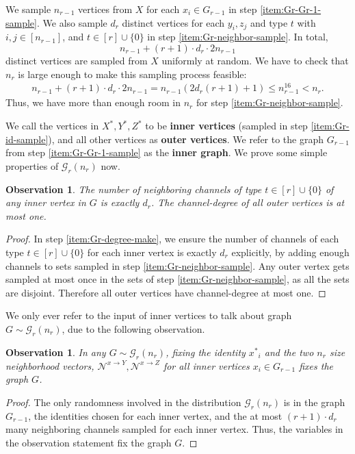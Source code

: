 \documentclass[11pt]{article}
\newtheorem{observation}[lemma]{Observation}
\theoremstyle{definition}
\renewcommand{\leq}{\leqslant}
\newcommand{\xstar}{\ensuremath{x^{*}}}
\newcommand{\Xstar}{\ensuremath{X^{*}}}
\newcommand{\Ystar}{\ensuremath{Y^{*}}}
\newcommand{\Zstar}{\ensuremath{Z^{*}}}
\newcommand{\Nbhood}[3]{\ensuremath{\mathcal{N}^{#1_{#3} \to #2}}}
\newcommand{\cG}{\ensuremath{\mathcal{G}}}
\begin{document}
We sample $n_{r-1}$ vertices from $X$ for each $x_i \in G_{r-1}$ in step \ref{item:Gr-Gr-1-sample}. We also sample $d_r$ distinct vertices for each $y_i, z_j$ and type $t$ with $i, j \in [n_{r-1}]$, and $t \in [r] \cup \{0\}$ in step \ref{item:Gr-neighbor-sample}. In total, 
\begin{equation*}
n_{r-1} + (r+1) \cdot d_{r} \cdot 2n_{r-1}
\end{equation*}
distinct vertices are sampled from $X$ uniformly at random. 
We have to check that $n_r$ is large enough to make this sampling process  feasible:
\begin{align*}
	n_{r-1} + (r+1) \cdot d_{r} \cdot 2n_{r-1} = n_{r-1}(2d_r(r+1) + 1) \leq n_{r-1}^{16} < n_r.
\end{align*}
Thus, we have more than enough room in $n_r$ for step \ref{item:Gr-neighbor-sample}.

We call the vertices in $\Xstar, \Ystar, \Zstar$ to be \textbf{inner vertices} (sampled in step \ref{item:Gr-id-sample}), and all other vertices  as \textbf{outer vertices}. We refer to the graph $G_{r-1}$ from step \ref{item:Gr-Gr-1-sample} as the \textbf{inner graph}. 
We prove some simple properties of $\cG_r(n_r)$ now. 

\begin{observation}\label{obs:G_r-degree}
	The number of neighboring channels of type $t \in [r] \cup \{0\}$ of any inner vertex in $G$ is exactly $d_r$. The channel-degree of all outer vertices is at most one. 
\end{observation}
\begin{proof}
	In step \ref{item:Gr-degree-make}, we ensure the number of channels of each type $t \in [r] \cup \{0\}$ for each inner vertex is exactly $d_r$ explicitly, by adding enough channels to sets sampled in step \ref{item:Gr-neighbor-sample}. Any outer vertex gets sampled at most once in the sets of step \ref{item:Gr-neighbor-sample}, as all the sets are disjoint. Therefore all outer vertices have channel-degree at most one.
\end{proof}

We only ever refer to the input of inner vertices to talk about graph $G \sim \cG_r(n_r)$, due to the following observation. 

\begin{observation}\label{obs:input-fix-inner}
	In any $G \sim \cG_r(n_r)$, fixing the identity $\xstar_i$ and the two $n_r$ size neighborhood vectors, $\Nbhood{x}{Y}{}, \Nbhood{x}{Z}{}$ for all inner vertices $x_i \in G_{r-1}$ fixes the graph $G$. 
\end{observation}
\begin{proof}
	The only randomness involved in the distribution $\cG_r(n_r)$ is in the graph $G_{r-1}$, the identities chosen for each inner vertex, and the at most $(r+1) \cdot d_r$ many neighboring channels sampled for each inner vertex. Thus, the 
	variables in the observation statement fix the graph $G$. 
\end{proof}
\end{document}
